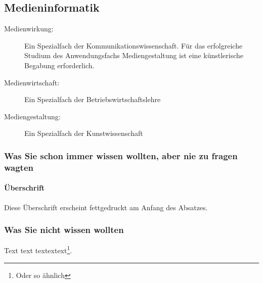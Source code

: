 \documentclass[11pt,a4paper,twoside]{article}
\begin{document}
\subsection{Medieninformatik}

\begin{description}
  \item[Medienwirkung:] Ein Spezialfach der Kommunikationswissenschaft. Für das erfolgreiche Studium des Anwendungsfachs Mediengestaltung ist eine künstlerische Begabung erforderlich.
  \item[Medienwirtschaft:] Ein Spezialfach der Betriebswirtschaftslehre
  \item[Mediengestaltung:] Ein Spezialfach der Kunstwissenschaft
\end{description}

\subsubsection{Was Sie schon immer wissen wollten, aber nie zu fragen
  wagten}

\paragraph{Überschrift}
Diese Überschrift erscheint fettgedruckt am Anfang des Absatzes.

\subsubsection{Was Sie nicht wissen wollten}

Text text textextext\footnote{Oder so ähnlich}.

\fi

\end{document}
